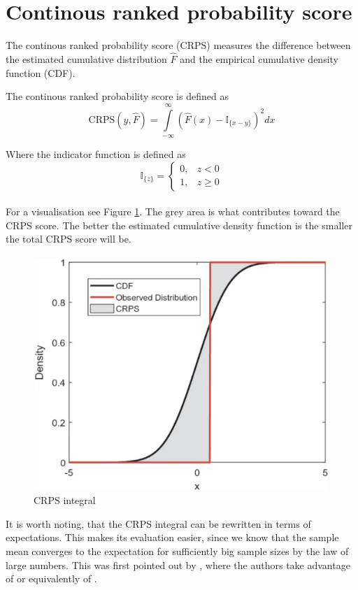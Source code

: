 \section{Continous ranked probability score}
The continous ranked probability score (CRPS) measures the difference between the estimated cumulative distribution $\hat{F}$ and the empirical cumulative density function (CDF).
\begin{definition}\label{def_crps}
    The continous ranked probability score is defined as
    $$
    \mathrm{CRPS}(y, \hat{F})=\int\limits_{-\infty}^{\infty}\left(\hat{F}(x)-\mathbb{I}_{\{x-y\}} \right)^2 dx
    $$
\end{definition}
Where the indicator function is defined as 
    $$\mathbb{I}_{\{z\}}=
\begin{cases}
0, & z<0\\
1, & z \geq 0
\end{cases}$$
\\
For a visualisation see Figure \ref{fig:crps}. The grey area is what contributes toward the CRPS score.
The better the estimated cumulative density function is the smaller the total CRPS score will be.
\begin{figure}
    \includegraphics[width=\textwidth]{images/crps.png}
    \caption{CRPS integral \cite{haben2023core}}
    \label{fig:crps}
  \end{figure}
It is worth noting, that the CRPS integral can be rewritten in terms of expectations. This makes its evaluation easier, since we know that the sample mean converges to the expectation for sufficiently big sample sizes by the law of large numbers. This was first pointed out by \cite{proper_scores}, where the authors take advantage of \cite[Lemma 2.2]{new_multi_test2} or equivalently of \cite[Identity (17)]{new_multi_tes1}.
